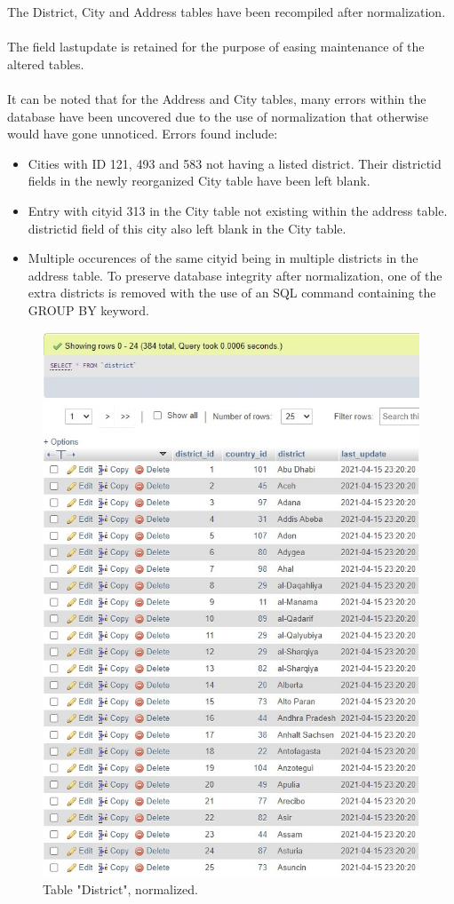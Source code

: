 \documentclass[openany]{article}
\begin{document}
		The District, City and Address tables have been recompiled after normalization. \\\\
		The field last\textunderscore update is retained for the purpose of easing maintenance of the altered tables. \\\\
		It can be noted that for the Address and City tables, many errors within the database have been uncovered due to the use of normalization that otherwise would have gone unnoticed.  Errors found include: 
		\begin{itemize}
			\item Cities with ID 121, 493 and 583 not having a listed district. Their district\textunderscore id fields in the newly reorganized City table have been left blank.
			\item Entry with city\textunderscore id 313 in the City table not existing within the address table. district\textunderscore id field of this city also left blank in the City table.
			\item Multiple occurences of the same city\textunderscore id being in multiple districts in the address table. To preserve database integrity after normalization, one of the extra districts is removed with the use of an SQL command containing the GROUP BY keyword. 
		\end{itemize}
		\begin{figure}[H]
			\includegraphics[width=\textwidth]{table_district_norm}
			\caption{Table "District", normalized.}
		\end{figure}
\end{document}
